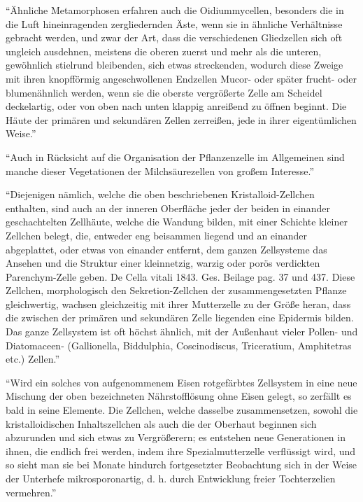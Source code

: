 \documentclass[a4paper, 12pt, oneside]{article}
\begin{document}
"`Ähnliche Metamorphosen erfahren auch die Oidiummycellen, besonders die in die Luft hineinragenden zergliedernden Äste, wenn sie in ähnliche Verhältnisse gebracht werden, und zwar der Art, dass die verschiedenen Gliedzellen sich oft ungleich ausdehnen, meistens die oberen zuerst und mehr als die unteren, gewöhnlich stielrund bleibenden, sich etwas streckenden, wodurch diese Zweige mit ihren knopfförmig angeschwollenen Endzellen Mucor- oder später frucht- oder blumenähnlich werden, wenn sie die oberste vergrößerte Zelle am Scheidel deckelartig, oder von oben nach unten klappig anreißend zu öffnen beginnt. Die Häute der primären und sekundären Zellen zerreißen, jede in ihrer eigentümlichen Weise."'

"`Auch in Rücksicht auf die Organisation der Pflanzenzelle im Allgemeinen sind manche dieser Vegetationen der Milchsäurezellen von großem Interesse."'

"`Diejenigen nämlich, welche die oben beschriebenen Kristalloid-Zellchen enthalten, sind auch an der inneren Oberfläche jeder der beiden in einander geschachtelten Zellhäute, welche die Wandung bilden, mit einer Schichte kleiner Zellchen belegt, die, entweder eng beisammen liegend und an einander abgeplattet, oder etwas von einander entfernt, dem ganzen Zellsysteme das Ansehen und die Struktur einer kleinnetzig, warzig oder porös verdickten Parenchym-Zelle geben. De Cella vitali 1843. Ges. Beilage pag. 37 und 437. Diese Zellchen, morphologisch den Sekretion-Zellchen der zusammengesetzten Pflanze gleichwertig, wachsen gleichzeitig mit ihrer Mutterzelle zu der Größe heran, dass die zwischen der primären und sekundären Zelle liegenden eine Epidermis bilden. Das ganze Zellsystem ist oft höchst ähnlich, mit der Außenhaut vieler Pollen- und Diatomaceen- (Gallionella, Biddulphia, Coscinodiscus, Triceratium, Amphitetras etc.) Zellen."'

"`Wird ein solches von aufgenommenem Eisen rotgefärbtes Zellsystem in eine neue Mischung der oben bezeichneten Nährstofflösung ohne Eisen gelegt, so zerfällt es bald in seine Elemente. Die Zellchen, welche dasselbe zusammensetzen, sowohl die kristalloidischen Inhaltszellchen als auch die der Oberhaut beginnen sich abzurunden und sich etwas zu Vergrößerern; es entstehen neue Generationen in ihnen, die endlich frei werden, indem ihre Spezialmutterzelle verflüssigt wird, und so sieht man sie bei Monate hindurch fortgesetzter Beobachtung sich in der Weise der Unterhefe mikrosporonartig, d. h. durch Entwicklung freier Tochterzelien vermehren."'
\end{document}
